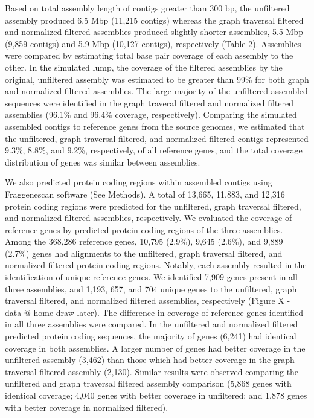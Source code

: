 \documentclass[11pt]{article} %
\begin{document}
Based on total assembly length of contigs greater than 300 bp, the unfiltered assembly produced 6.5 Mbp (11,215 contigs) whereas the graph traversal filtered and normalized filtered assemblies produced slightly shorter assemblies, 5.5 Mbp (9,859 contigs) and 5.9 Mbp (10,127 contigs), respectively (Table 2).  Assemblies were compared by estimating total base pair coverage of each assembly to the other.  In the simulated lump, the coverage of the filtered assemblies by the original, unfiltered assembly was estimated to be greater than 99\% for both graph and normalized filtered assemblies.  The large majority of the unfiltered assembled sequences were identified in the graph traveral filtered and normalized filtered assemblies (96.1\% and 96.4\% coverage, respectively).  Comparing the simulated assembled contigs to reference genes from the source genomes, we estimated that the unfiltered, graph traversal filtered, and normalized filtered contigs represented 9.3\%, 8.8\%, and 9.2\%, respectively, of all reference genes, and the total coverage distribution of genes was similar between assemblies.   

We also predicted protein coding regions within assembled contigs using Fraggenescan software (See Methods).  A total of 13,665, 11,883, and 12,316 protein coding regions were predicted for the unfiltered, graph traversal filtered, and normalized filtered assemblies, respectively.  We evaluated the coverage of reference genes by predicted protein coding regions of the three assemblies.  Among the 368,286 reference genes, 10,795 (2.9\%), 9,645 (2.6\%), and 9,889 (2.7\%) genes had alignments to the unfiltered, graph traversal filtered, and normalized filtered protein coding regions.  Notably, each assembly resulted in the identification of unique reference genes.  We identified 7,909 genes present in all three assemblies, and 1,193, 657, and 704 unique genes to the unfiltered, graph traversal filtered, and normalized filtered assemblies, respectively (Figure X - data @ home draw later).  The difference in coverage of reference genes identified in all three assemblies were compared.  In the unfiltered and normalized filtered predicted protein coding sequences, the majority of genes (6,241) had identical coverage in both assemblies.  A larger number of genes had better coverage in the unfiltered assembly (3,462) than those which had better coverage in the graph traversal filtered assembly (2,130).  Similar results were observed comparing the unfiltered and graph traversal filtered assembly comparison (5,868 genes with identical coverage; 4,040 genes with better coverage in unfiltered; and 1,878 genes with better coverage in normalized filtered).  
\end{document}
